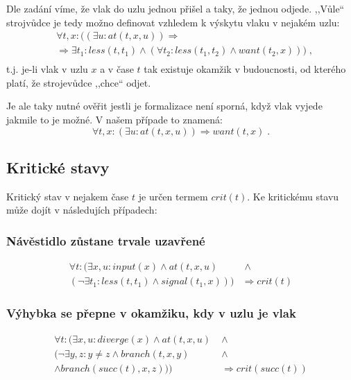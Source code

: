 \documentclass[a4paper,journal]{IEEEtran}
\begin{document}
Dle zadání víme, že vlak do uzlu jednou přišel a taky, že jednou odjede. ,,Vůle`` strojvůdce je tedy možno definovat
vzhledem k výskytu vlaku v nejakém uzlu:
\begin{equation}
\begin{split}
&\forall t,x: ((\exists u: at(t,x,u)) \Rightarrow \\ 
&\Rightarrow\exists t_1: less(t,t_1) \wedge (\forall t_2: less(t_1,t_2) \wedge want(t_2,x)))\;,\\
\end{split}
\end{equation}
t.j. je-li vlak v uzlu $x$ a v čase $t$ tak existuje okamžik v budoucnosti, od kterého platí, že
strojevůdce ,,chce`` odjet.

Je ale taky nutné ověřit jestli je formalizace není sporná, když vlak vyjede jakmile to je možné. V našem
případe to znamená:
\begin{equation}
\forall t,x: (\exists u: at(t,x,u)) \Rightarrow want(t,x)\;.
\end{equation}

\subsection{Kritické stavy}
Kritický stav v nejakem čase $t$ je určen termem $crit(t)$. Ke kritickému stavu může dojít v 
následujích případech:
\subsubsection{Návěstidlo zůstane trvale uzavřené}
\begin{equation}
\begin{split}
\forall t: (\exists x,u: input(x) \wedge at(t,x,u)& \;\wedge\\
 (\neg \exists t_1: less(t,t_1) \wedge signal(t_1,x))) &\Rightarrow crit(t)
\end{split}
\end{equation}
\subsubsection{Výhybka se přepne v okamžiku, kdy v uzlu je vlak}
\begin{equation}
\begin{split}
\forall t: (\exists x,u: diverge(x) \wedge at(t,x,u)& \;\wedge\\
 (\neg \exists y,z: y\not=z \wedge branch(t,x,y) & \;\wedge  \\
 \wedge branch(succ(t),x,z) )) &\;\Rightarrow crit(succ(t))
\end{split}
\end{equation}
\end{document}
